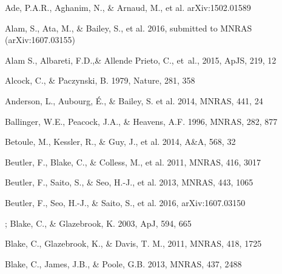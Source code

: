 \documentclass[iop]{emulateapj}
\begin{document}
\begin{thebibliography}{}

Ade, P.A.R., Aghanim, N., \& Arnaud, M., et al. arXiv:1502.01589

Alam, S., Ata, M., \& Bailey, S., et al. 2016,
submitted to MNRAS (arXiv:1607.03155)

{Alam} S., Albareti, F.D.,\& Allende Prieto, C., {et~al.}, 2015,  ApJS, 219, 12

Alcock, C., \& Paczynski, B. 1979, Nature, 281, 358  


Anderson, L., Aubourg, \'E., \& Bailey, S. et al. 2014, MNRAS, 441, 24  
  

Ballinger, W.E., Peacock, J.A., \& Heavens, A.F. 1996, MNRAS, 282, 877  

Betoule, M., Kessler, R., \& Guy, J., et al. 2014, A\&A, 568, 32


Beutler, F., Blake, C., \& Colless, M., et al. 2011, MNRAS, 416, 3017

Beutler, F., Saito, S., \& Seo, H.-J., et al. 2013, MNRAS, 443, 1065

Beutler, F., Seo, H.-J., \& Saito, S., et al. 2016,
arXiv:1607.03150



;
 Blake, C., \& Glazebrook, K. 2003, ApJ, 594, 665


Blake, C., Glazebrook, K., \& Davis, T. M., 2011, MNRAS, 418, 1725  

Blake, C., James, J.B., \& Poole, G.B. 2013, MNRAS, 437, 2488


\end{thebibliography}
\end{document}
